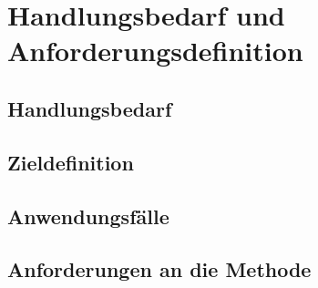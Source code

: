 \cleardoublepage

\chapter{Handlungsbedarf und Anforderungsdefinition}
\label{ch:Kapt3}

\section{Handlungsbedarf}
\label{sec:Handlungsgedarf}

\section{Zieldefinition}
\label{sec:Zieldefi}

\section{Anwendungsfälle}
\label{sec:Anwend}

\section{Anforderungen an die Methode}
\label{sec:AnfordMethode}

